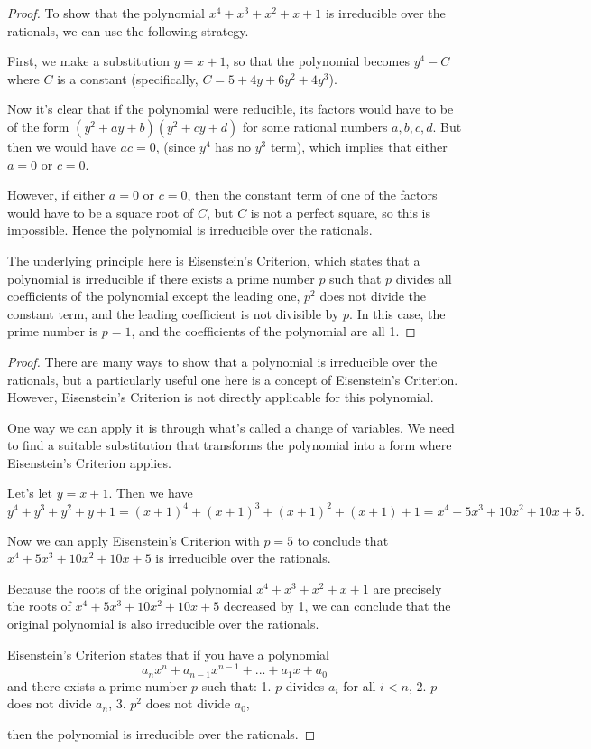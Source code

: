 \documentclass{amsart}
\theoremstyle{plain}
\begin{document}
\begin{proof}To show that the polynomial $x^4 + x^3 + x^2 + x + 1$ is irreducible over the rationals, we can use the following strategy. 

First, we make a substitution $y = x+1$, so that the polynomial becomes $y^4 - C$ where $C$ is a constant (specifically, $C = 5 + 4y + 6y^2 + 4y^3$). 

Now it's clear that if the polynomial were reducible, its factors would have to be of the form $(y^2 + ay + b)(y^2 + cy + d)$ for some rational numbers $a, b, c, d$. But then we would have $ac=0$, (since $y^4$ has no $y^3$ term), which implies that either $a=0$ or $c=0$.

However, if either $a=0$ or $c=0$, then the constant term of one of the factors would have to be a square root of $C$, but $C$ is not a perfect square, so this is impossible. Hence the polynomial is irreducible over the rationals. 

The underlying principle here is Eisenstein's Criterion, which states that a polynomial is irreducible if there exists a prime number $p$ such that $p$ divides all coefficients of the polynomial except the leading one, $p^2$ does not divide the constant term, and the leading coefficient is not divisible by $p$. In this case, the prime number is $p=1$, and the coefficients of the polynomial are all 1.\end{proof}
\begin{proof}There are many ways to show that a polynomial is irreducible over the rationals, but a particularly useful one here is a concept of Eisenstein's Criterion. However, Eisenstein's Criterion is not directly applicable for this polynomial. 

One way we can apply it is through what's called a change of variables. We need to find a suitable substitution that transforms the polynomial into a form where Eisenstein's Criterion applies. 

Let's let $y = x+1$. Then we have
$y^4 + y^3 + y^2 + y + 1 = (x+1)^4 + (x+1)^3 + (x+1)^2 + (x+1) + 1 = x^4 + 5x^3 + 10x^2 + 10x + 5.$ 

Now we can apply Eisenstein's Criterion with $p = 5$ to conclude that $x^4 + 5x^3 + 10x^2 + 10x + 5$ is irreducible over the rationals.

Because the roots of the original polynomial $x^4 + x^3 + x^2 + x + 1$ are precisely the roots of $x^4 + 5x^3 + 10x^2 + 10x + 5$ decreased by 1, we can conclude that the original polynomial is also irreducible over the rationals.

Eisenstein's Criterion states that if you have a polynomial 
\[a_nx^n + a_{n-1}x^{n-1} + ... + a_1x + a_0\]
and there exists a prime number $p$ such that:
1. $p$ divides $a_i$ for all $i < n$,
2. $p$ does not divide $a_n$,
3. $p^2$ does not divide $a_0$,

then the polynomial is irreducible over the rationals.\end{proof}
\end{document}
